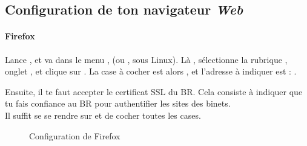 
\subsection{Configuration de ton navigateur \emph{Web}}
\label{browser}

\paragraph{Firefox}

Lance , et va dans le menu ,
 (ou ,  sous Linux). Là , sélectionne la rubrique , onglet , et clique sur
. La case à  cocher est alors ,
et l'adresse à  indiquer est : .

Ensuite, il te faut accepter le certificat SSL du BR. Cela consiste à indiquer que tu fais confiance au BR pour authentifier les sites des binets.\\
Il suffit se se rendre sur  et de cocher toutes les cases.\\

\noindent
  \begin{figure}[!h]
    \begin{center}  
           \caption{Configuration de Firefox}
    \end{center}
  \end{figure}
%

